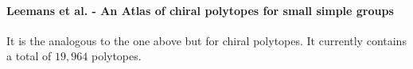 \paragraph{Leemans et al. - An Atlas of chiral polytopes for small simple groups} It is the analogous to the one above but for chiral polytopes. It currently contains a total of $19,964$ polytopes.







%
%
%
%
